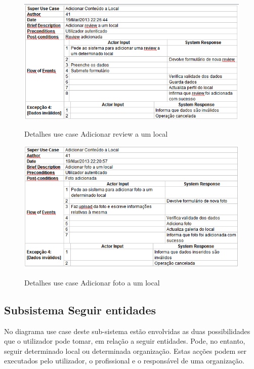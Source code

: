 \documentclass[12pt,a4paper]{article}
\begin{document}
\begin{figure}[h!]
\centering
\includegraphics[scale=0.7]{d_usecase/adicionarreview}
\label{usecase}
\caption{Detalhes use case Adicionar review a um local}
\end{figure}

\begin{figure}[h!]
\centering
\includegraphics[scale=0.7]{d_usecase/adicionarfoto}
\label{usecase}
\caption{Detalhes use case Adicionar foto a um local}
\end{figure}

\clearpage
\subsection{Subsistema Seguir entidades}
No diagrama use case deste sub-sistema estão envolvidas as duas possibilidades que o utilizador pode tomar, em relação a seguir entidades. Pode, no entanto, seguir determinado local ou determinada organização. Estas acções podem ser executados pelo utilizador, o profissional e o responsável de uma organização.\\
\end{document}
